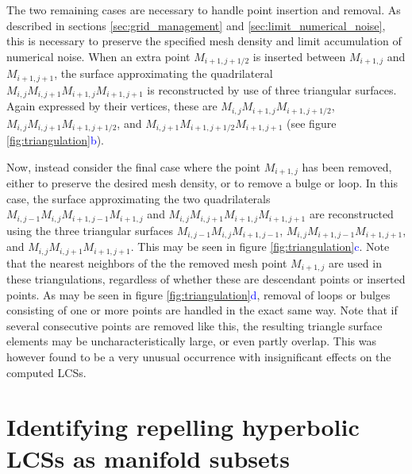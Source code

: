 The two remaining cases are necessary to handle point insertion and removal. As described in sections \ref{sec:grid_management} and \ref{sec:limit_numerical_noise}, this is necessary to preserve the specified mesh density and limit accumulation of numerical noise. When an extra point $M_{i+1,j+1/2}$ is inserted between $M_{i+1,j}$ and $M_{i+1,j+1}$, the surface approximating the quadrilateral $M_{i,j}M_{i,j+1}M_{i+1,j}M_{i+1,j+1}$ is reconstructed by use of three triangular surfaces. Again expressed by their vertices, these are $M_{i,j}M_{i+1,j}M_{i+1,j+1/2}$, $M_{i,j}M_{i,j+1}M_{i+1,j+1/2}$, and $M_{i,j+1}M_{i+1,j+1/2}M_{i+1,j+1}$ (see figure \ref{fig:triangulation}\textcolor{blue}{b}).

Now, instead consider the final case where the point $M_{i+1,j}$ has been removed, either to preserve the desired mesh density, or to remove a bulge or loop. In this case, the surface approximating the two quadrilaterals $M_{i,j-1}M_{i,j}M_{i+1,j-1}M_{i+1,j}$ and $M_{i,j}M_{i,j+1}M_{i+1,j}M_{i+1,j+1}$ are reconstructed using the three triangular surfaces $M_{i,j-1}M_{i,j}M_{i+1,j-1}$, $M_{i,j}M_{i+1,j-1}M_{i+1,j+1}$, and $M_{i,j}M_{i,j+1}M_{i+1,j+1}$. This may be seen in figure \ref{fig:triangulation}\textcolor{blue}{c}. Note that the nearest neighbors of the the removed mesh point $M_{i+1,j}$ are used in these triangulations, regardless of whether these are descendant points or inserted points. As may be seen in figure \ref{fig:triangulation}\textcolor{blue}{d}, removal of loops or bulges consisting of one or more points are handled in the exact same way. Note that if several consecutive points are removed like this, the resulting triangle surface elements may be uncharacteristically large, or even partly overlap. This was however found to be a very unusual occurrence with insignificant effects on the computed LCSs.

\section{Identifying repelling hyperbolic LCSs as manifold subsets}\label{sec:candidate_identification}


